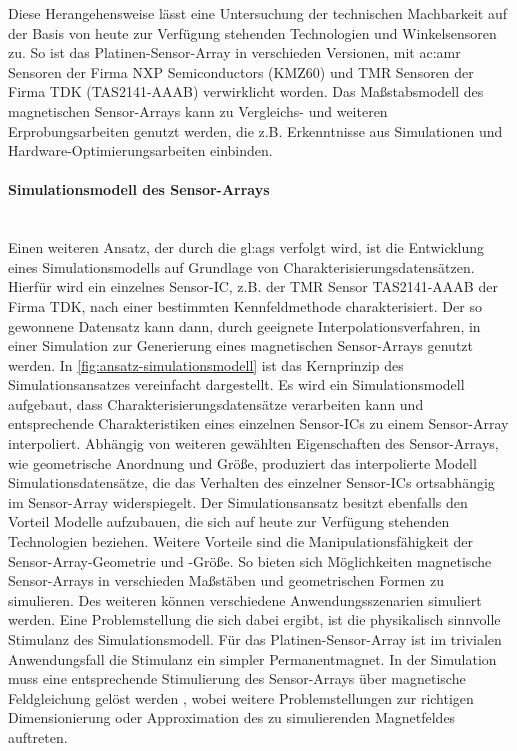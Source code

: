 \clearpage


Diese Herangehensweise lässt eine Untersuchung der technischen Machbarkeit auf der Basis von heute zur Verfügung stehenden Technologien und Winkelsensoren zu.
So ist das Platinen-Sensor-Array in verschieden Versionen, mit \gls{ac:amr} Sensoren der Firma NXP Semiconductors (KMZ60) \cite{NXPSemiconductors2014} und TMR Sensoren der Firma TDK (TAS2141-AAAB) \cite{TDK2016} verwirklicht worden. Das Maßstabsmodell des magnetischen Sensor-Arrays kann zu Vergleichs- und weiteren Erprobungsarbeiten genutzt werden, die z.B. Erkenntnisse aus Simulationen und Hardware-Optimierungsarbeiten einbinden.


\paragraph{Simulationsmodell des Sensor-Arrays}\label{par:simulationsmodell-des-sensor-arrays}$~$\\


Einen weiteren Ansatz, der durch die \gls{gl:ags} verfolgt wird, ist die Entwicklung eines Simulationsmodells auf Grundlage von Charakterisierungsdatensätzen. Hierfür wird ein einzelnes Sensor-IC, z.B. der TMR Sensor TAS2141-AAAB der Firma TDK, nach einer bestimmten Kennfeldmethode \cite{Schuethe2019} charakterisiert. Der so gewonnene Datensatz kann dann, durch geeignete Interpolationsverfahren, in einer Simulation zur Generierung eines magnetischen Sensor-Arrays genutzt werden. In \autoref{fig:ansatz-simulationsmodell} ist das Kernprinzip des Simulationsansatzes vereinfacht dargestellt. Es wird ein Simulationsmodell aufgebaut, dass Charakterisierungsdatensätze verarbeiten kann und entsprechende Charakteristiken eines einzelnen Sensor-ICs zu einem Sensor-Array interpoliert. Abhängig von weiteren gewählten Eigenschaften des Sensor-Arrays, wie geometrische Anordnung und Größe, produziert das interpolierte Modell Simulationsdatensätze, die das Verhalten des einzelner Sensor-ICs ortsabhängig im Sensor-Array widerspiegelt.
\newline
Der Simulationsansatz besitzt ebenfalls den Vorteil Modelle aufzubauen, die sich auf heute zur Verfügung stehenden Technologien beziehen. Weitere Vorteile sind die Manipulationsfähigkeit der Sensor-Array-Geometrie und -Größe. So bieten sich Möglichkeiten magnetische Sensor-Arrays in verschieden Maßstäben und geometrischen Formen zu simulieren. Des weiteren können verschiedene Anwendungsszenarien simuliert werden. Eine Problemstellung die sich dabei ergibt, ist die physikalisch sinnvolle Stimulanz des Simulationsmodell. Für das Platinen-Sensor-Array ist im trivialen Anwendungsfall die Stimulanz ein simpler Permanentmagnet. In der Simulation muss eine entsprechende Stimulierung des Sensor-Arrays über magnetische Feldgleichung gelöst werden \cite{Pape2017}\cite{Schuethe2019}, wobei weitere Problemstellungen zur richtigen Dimensionierung oder Approximation des zu simulierenden Magnetfeldes auftreten.


